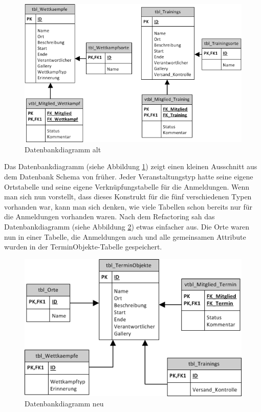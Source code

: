 \begin{figure}[h]
\centering
\includegraphics[scale=0.7]{images/visio/datenbankdiagramm_alt.png}
\caption{Datenbankdiagramm alt}
\label{fig:db_schema_alt}
\end{figure}

Das Datenbankdiagramm (siehe Abbildung \ref{fig:db_schema_alt}) zeigt einen kleinen Ausschnitt aus dem Datenbank Schema von früher. Jeder Veranstaltungstyp hatte seine eigene Ortstabelle und seine eigene Verknüpfungstabelle für die Anmeldungen. Wenn man sich nun vorstellt, dass dieses Konstrukt für die fünf verschiedenen Typen vorhanden war, kann man sich denken, wie viele Tabellen schon bereits nur für die Anmeldungen vorhanden waren. Nach dem Refactoring sah das Datenbankdiagramm (siehe Abbildung \ref{fig:db_schema_neu}) etwas einfacher aus. Die Orte waren nun in einer Tabelle, die Anmeldungen auch und alle gemeinsamen Attribute wurden in der TerminObjekte-Tabelle gespeichert.

\begin{figure}[h]
\centering
\includegraphics[scale=0.7]{images/visio/datenbankdiagramm_neu.png}
\caption{Datenbankdiagramm neu}
\label{fig:db_schema_neu}
\end{figure}

